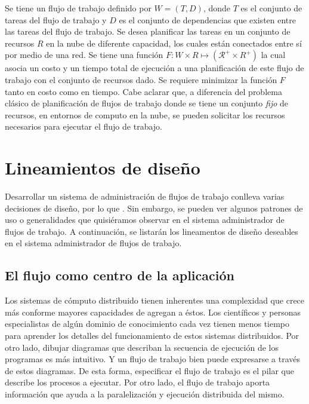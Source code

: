 Se tiene un flujo de trabajo definido por $W = (T, D)$, donde $T$ es el conjunto de tareas del flujo de trabajo y $D$ es el conjunto de dependencias que existen entre las tareas del flujo de trabajo. Se desea planificar las tareas en un conjunto de recursos $R$ en la nube de diferente capacidad, los cuales están conectados entre sí por medio de una red. Se tiene una función $F: W \times R \mapsto (\mathcal{R}^{+} \times {R}^{+}) $ la cual asocia un costo y un tiempo total de ejecución a una planificación de este flujo de trabajo con el conjunto de recursos dado. Se requiere minimizar la función $F$ tanto en costo como en tiempo. Cabe aclarar que, a diferencia del problema clásico de planificación de flujos de trabajo donde se tiene un conjunto \emph{fijo} de recursos, en entornos de computo en la nube, se pueden solicitar los recursos necesarios para ejecutar el flujo de trabajo.


\section{Lineamientos de diseño}

Desarrollar un sistema de administración de flujos de trabajo conlleva varias decisiones de diseño, por lo que . Sin embargo, se pueden ver algunos patrones de uso o generalidades que quisiéramos observar en el sistema administrador de flujos de trabajo. A continuación, se listarán los lineamentos de diseño deseables en el sistema administrador de flujos de trabajo.



\subsection{El flujo como centro de la aplicación}

Los sistemas de cómputo distribuido tienen inherentes una complexidad que crece más conforme mayores capacidades de agregan a éstos. Los científicos y personas especialistas de algún dominio de conocimiento cada vez tienen menos tiempo para aprender los detalles del funcionamiento de estos sistemas distribuidos. Por otro lado, dibujar diagramas que describan la secuencia de ejecución de los programas es más intuitivo. Y un flujo de trabajo bien puede expresarse a través de estos diagramas. De esta forma, especificar el flujo de trabajo es el pilar que describe los procesos a ejecutar. Por otro lado, el flujo de trabajo aporta información que ayuda a la paralelización y ejecución distribuida del mismo.



